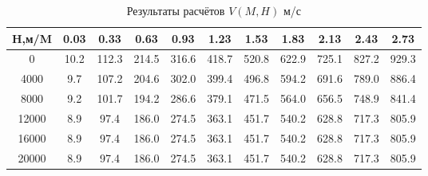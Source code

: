 \begin{table}[H]
\centering
\caption{Результаты расчётов $V(M,H)$ м/с}
\label{V}
\begin{tabular}{|c|c|c|c|c|c|c|c|c|c|c|}
\toprule
H,м/M &  0.03 &   0.33 &   0.63 &   0.93 &   1.23 &   1.53 &   1.83 &   2.13 &   2.43 &   2.73 \\
\midrule
0     &  10.2 &  112.3 &  214.5 &  316.6 &  418.7 &  520.8 &  622.9 &  725.1 &  827.2 &  929.3 \\
4000  &   9.7 &  107.2 &  204.6 &  302.0 &  399.4 &  496.8 &  594.2 &  691.6 &  789.0 &  886.4 \\
8000  &   9.2 &  101.7 &  194.2 &  286.6 &  379.1 &  471.5 &  564.0 &  656.5 &  748.9 &  841.4 \\
12000 &   8.9 &   97.4 &  186.0 &  274.5 &  363.1 &  451.7 &  540.2 &  628.8 &  717.3 &  805.9 \\
16000 &   8.9 &   97.4 &  186.0 &  274.5 &  363.1 &  451.7 &  540.2 &  628.8 &  717.3 &  805.9 \\
20000 &   8.9 &   97.4 &  186.0 &  274.5 &  363.1 &  451.7 &  540.2 &  628.8 &  717.3 &  805.9 \\
\bottomrule
\end{tabular}
\end{table}
